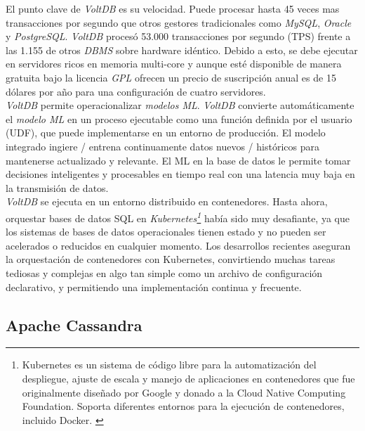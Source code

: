 \documentclass[10pt]{article}
\begin{document}
El punto clave de \emph{VoltDB} es su velocidad. Puede procesar hasta 45 veces mas transacciones por segundo que otros gestores tradicionales como \emph{MySQL}, \emph{Oracle} y \emph{PostgreSQL}. \emph{VoltDB} procesó 53.000 transacciones por segundo (TPS) frente a las 1.155 de otros \emph{DBMS} sobre hardware idéntico. \cite{VOLT:5} Debido a esto, se debe ejecutar en servidores ricos en memoria multi-core y aunque esté disponible de manera gratuita bajo la licencia \emph{GPL} ofrecen un precio de suscripción anual es de 15 dólares por año para una configuración de cuatro servidores.\\

\emph{VoltDB} permite operacionalizar \emph{modelos ML}. \emph{VoltDB} convierte automáticamente el \emph{modelo ML} en un proceso ejecutable como una función definida por el usuario (UDF), que puede implementarse en un entorno de producción. El modelo integrado ingiere / entrena continuamente datos nuevos / históricos para mantenerse actualizado y relevante. El ML en la base de datos le permite tomar decisiones inteligentes y procesables en tiempo real con una latencia muy baja en la transmisión de datos. \cite{VOLT:6}\\

\emph{VoltDB} se ejecuta en un entorno distribuido en contenedores. Hasta ahora, orquestar bases de datos SQL en \emph{Kubernetes\footnote{Kubernetes es un sistema de código libre para la automatización del despliegue, ajuste de escala y manejo de aplicaciones en contenedores que fue originalmente diseñado por Google y donado a la Cloud Native Computing Foundation. Soporta diferentes entornos para la ejecución de contenedores, incluido Docker. \cite{VOLT:7}}} había sido muy desafiante, ya que los sistemas de bases de datos operacionales tienen estado y no pueden ser acelerados o reducidos en cualquier momento. Los desarrollos recientes aseguran la orquestación de contenedores con Kubernetes, convirtiendo muchas tareas tediosas y complejas en algo tan simple como un archivo de configuración declarativo, y permitiendo una implementación continua y frecuente. \cite{VOLT:6}\\

\subsection{Apache Cassandra}
\end{document}
